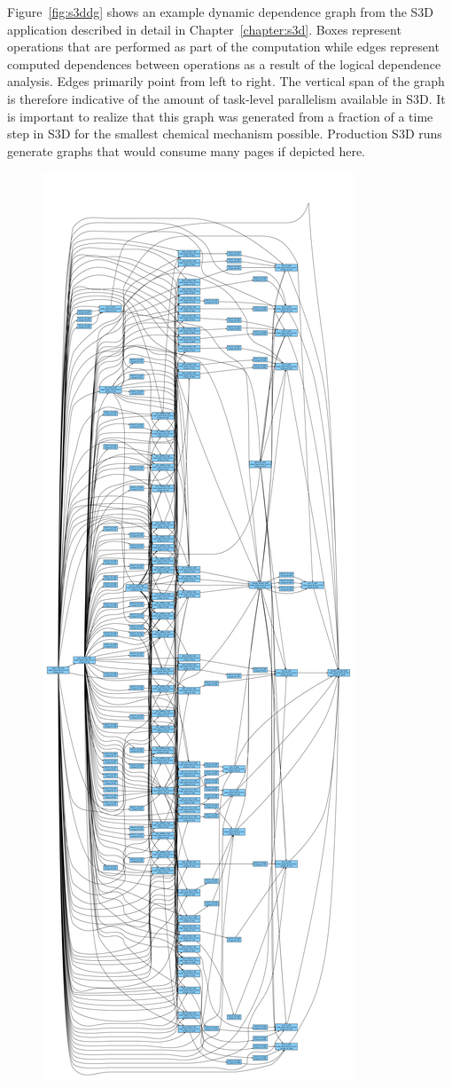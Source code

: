 Figure~\ref{fig:s3ddg} shows an example dynamic
dependence graph from the S3D application 
described in detail in Chapter~\ref{chapter:s3d}.
Boxes represent operations that are performed as
part of the computation while edges represent
computed dependences between operations as a
result of the logical dependence analysis.
Edges primarily point from left to right.
The vertical span of the graph is therefore
indicative of the amount of task-level parallelism
available in S3D. It is important to realize
that this graph was generated from a fraction of
a time step in S3D for the smallest chemical
mechanism possible. Production S3D runs generate
graphs that would consume many pages if 
depicted here.

\begin{figure}[ht!]
\centering
\includegraphics[scale=0.06]{figs/s3d_h2_smart_mapper}

\end{figure}
